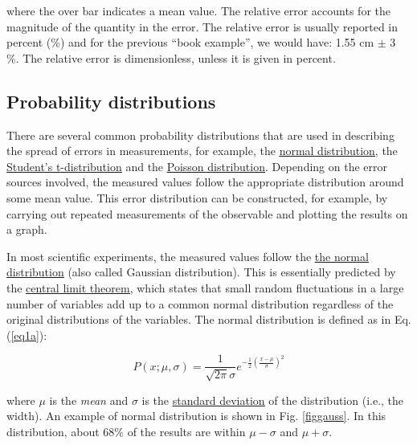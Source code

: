 \documentclass[byrevtex,amssymb,aps,pra,floatfix,letterpaper]{revtex4}
\begin{document}
\noindent
where the over bar indicates a mean value. The relative error accounts for the magnitude of the
quantity in the error. The relative error is usually reported in percent (\%) and for the previous
``book example'', we would have: 1.55 cm $\pm$ 3 \%. The relative error is dimensionless, unless it is
given in percent.

\subsection{Probability distributions}

There are several common probability distributions that are used in describing the spread of errors in measurements, for example, the \href{http://en.wikipedia.org/wiki/Normal_distribution}{\underline{normal distribution}}, the \href{http://en.wikipedia.org/wiki/Student's_t-distribution}{\underline{Student's t-distribution}} and the \href{http://en.wikipedia.org/wiki/Poisson_distribution}{\underline{Poisson distribution}}. Depending on the error sources involved, the measured values follow the appropriate distribution around some mean value. This error distribution can be constructed, for example, by carrying out repeated measurements of the observable and plotting the results on a graph.

In most scientific experiments, the measured values follow the \href{http://en.wikipedia.org/wiki/Normal_distribution}{\underline{the normal distribution}} (also called Gaussian distribution). This is essentially predicted by the \href{http://en.wikipedia.org/wiki/Central_limit_theorem}{\underline{central limit theorem}}, which states that small random fluctuations in a large number of variables add up to a common normal distribution regardless of the original distributions of the variables. The normal distribution is defined as in Eq. (\ref{eq1a}):

\begin{equation}
\label{eq1a}
P(x; \mu, \sigma) = \frac{1}{\sqrt{2\pi}\sigma}e^{-\frac{1}{2}\left(\frac{x-\mu}{\sigma}\right)^2}
\end{equation}

\noindent
where $\mu$ is the \textit{mean} and $\sigma$ is the \href{http://en.wikipedia.org/wiki/Standard_deviation}{\underline{standard deviation}} of the distribution (i.e., the width). An example of normal distribution is shown in Fig. \ref{figgauss}. In this distribution, about 68\% of the results are within $\mu - \sigma$ and $\mu + \sigma$.
\end{document}
